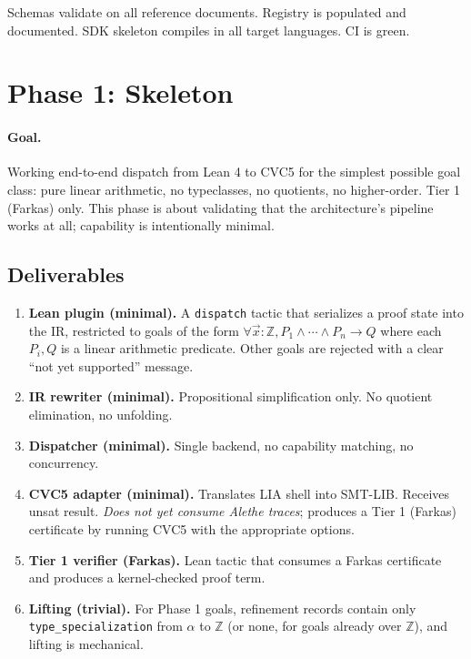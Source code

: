 \documentclass[11pt,letterpaper]{article}
\begin{document}
Schemas validate on all reference documents. Registry is populated and
documented. SDK skeleton compiles in all target languages. CI is green.

\section{Phase 1: Skeleton}
\label{sec:phase1}

\paragraph{Goal.} Working end-to-end dispatch from Lean 4 to CVC5 for
the simplest possible goal class: pure linear arithmetic, no
typeclasses, no quotients, no higher-order. Tier 1 (Farkas) only.
This phase is about validating that the architecture's pipeline works
at all; capability is intentionally minimal.

\subsection{Deliverables}

\begin{enumerate}
  \item \textbf{Lean plugin (minimal).} A \texttt{dispatch} tactic that
        serializes a proof state into the IR, restricted to goals of the
        form $\forall \vec{x} : \mathbb{Z}, P_1 \wedge \cdots \wedge P_n
        \to Q$ where each $P_i, Q$ is a linear arithmetic predicate.
        Other goals are rejected with a clear ``not yet supported''
        message.
  \item \textbf{IR rewriter (minimal).} Propositional simplification
        only. No quotient elimination, no unfolding.
  \item \textbf{Dispatcher (minimal).} Single backend, no capability
        matching, no concurrency.
  \item \textbf{CVC5 adapter (minimal).} Translates LIA shell into
        SMT-LIB. Receives unsat result. \emph{Does not yet consume
        Alethe traces}; produces a Tier 1 (Farkas) certificate by
        running CVC5 with the appropriate options.
  \item \textbf{Tier 1 verifier (Farkas).} Lean tactic that consumes a
        Farkas certificate and produces a kernel-checked proof term.
  \item \textbf{Lifting (trivial).} For Phase 1 goals, refinement
        records contain only \texttt{type\_specialization} from $\alpha$
        to $\mathbb{Z}$ (or none, for goals already over $\mathbb{Z}$),
        and lifting is mechanical.
\end{enumerate}
\end{document}

